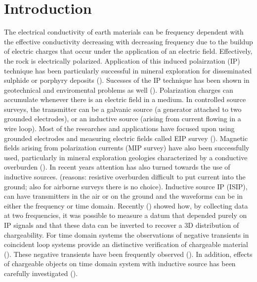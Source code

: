 \documentclass[extra,mreferee]{gji}
\begin{document}
\section{Introduction}
The electrical conductivity of earth materials can be frequency dependent with the effective conductivity decreasing with decreasing frequency due to the buildup of electric charges that occur under the application of an electric field.
Effectively, the rock is electrically polarized. 
Application of this induced polairzation (IP) technique has been particularly successful in mineral exploration for disseminated sulphide or porphyry deposits (\cite{Pelton1978, Fink1990}). Sucesses of the IP technique has been shown in geotechnical and enviromental problems as well (\cite{Kemna2012}). 
Polarization charges can accumulate whenever there is an electric field in a medium. In controlled source surveys, the transmitter can be a galvanic source (a generator attached to two grounded electrodes), or an inductive source (arising from current flowing in a wire loop). Most of the researches and applications have focused upon using grounded electrodes and measuring electric fields called EIP survey (\cite{seigel1959}). Magnetic fields arising from polarization currents (MIP survey) have also been successfully used, particularly in mineral exploration geologies characterized by a conductive overburden (\cite{seigel1974}). In recent years attention has also turned towards the use of inductive sources. (reasons:  resistive overburden difficult to put current into the ground; also for airborne surveys there is no choice).  Inductive source IP (ISIP), can have transmitters in the air or on the ground and the waveforms can be in either the frequency or time domain. Recently  (\cite{Marchant2012b}) showed how, by collecting data at two frequencies, it was possible to measure a datum that depended purely on IP signals and that these data can be inverted to recover a 3D distribution of chargeability. 
For time domain systems the observations of negative transients in coincident loop systems provide an distinctive verification of chargeable material (\cite{Weidelt1982}). These negative transients have been frequently observed (\cite{SmithandKlein,Kratzer2012,Kang2015a}). In addition, effects of chargeable objects on time domain system with inductive source has been carefully investigated (\cite{Smith1988a,Flis1989,ElKaliouby2004, Marchant2014}). 
\end{document}
